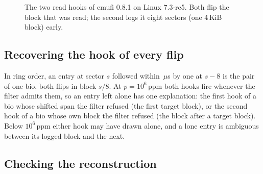\begin{figure}[t]
\centering
{}
\caption{The two read hooks of emufi 0.8.1 on Linux 7.3-rc5. Both flip
the block that was read; the second logs it eight sectors (one 4\,KiB
block) early.}
\label{fig:hooks}
\end{figure}

\subsection{Recovering the hook of every flip}

In ring order, an entry at sector $s$ followed within
\dtPairMaxMicro\,$\mu$s by
one at $s-8$ is the pair of one bio, both flips in block $s/8$. At
$p=10^{6}$\,ppm both hooks fire whenever the filter admits them, so an
entry left alone has one explanation: the first hook of a bio whose
shifted span the filter refused (the first target block), or the second
hook of a bio whose own block the filter refused (the block after a
target block). Below $10^{6}$\,ppm either hook may have drawn alone, and
a lone entry is ambiguous between its logged block and the next.

\subsection{Checking the reconstruction}

